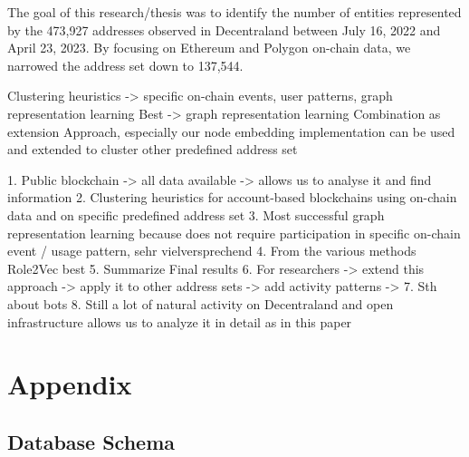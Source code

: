 \documentclass[12pt,a4paper,titlepage,oneside,english]{article}
\begin{document}
The goal of this research/thesis was to identify the number of entities represented by the 473,927 addresses observed in Decentraland between July 16, 2022 and April 23, 2023. By focusing on Ethereum and Polygon on-chain data, we narrowed the address set down to 137,544. 

Clustering heuristics -> specific on-chain events, user patterns, graph representation learning
Best -> graph representation learning
Combination as extension
Approach, especially our node embedding implementation can be used and extended to cluster other predefined address set

1. Public blockchain -> all data available -> allows us to analyse it and find information
2. Clustering heuristics for account-based blockchains using on-chain data and on specific predefined address set
3. Most successful graph representation learning because does not require participation in specific on-chain event / usage pattern, sehr vielversprechend
4. From the various methods Role2Vec best
5. Summarize Final results
6. For researchers -> extend this approach -> apply it to other address sets -> add activity patterns ->
7. Sth about bots
8. Still a lot of natural activity on Decentraland and open infrastructure allows us to analyze it in detail as in this paper


\newpage
\setcounter{page}{1}
\onehalfspacing
{}



\section{Appendix}

\subsection{Database Schema}
\label{sec:database}
\end{document}
